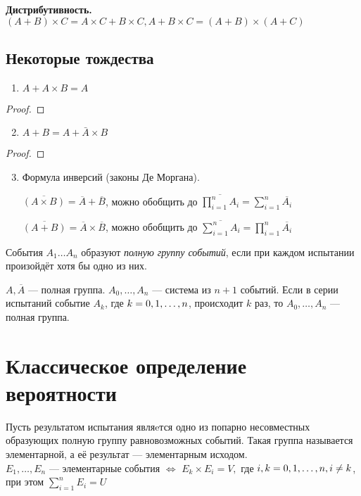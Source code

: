 \textbf{Дистрибутивность.} $(A + B)\times C = A\times C + B\times C,  A + B\times C = (A + B)\times (A + C)$

\subsection{Некоторые тождества}
\begin{enumerate}
	\item $A + A\times B = A$
\end{enumerate}
\begin{proof}
\end{proof}

\begin{enumerate}
	\setcounter{enumi}{1}
	\item{$A + B = A + \bar{A}\times B$}
\end{enumerate}
\begin{proof}
\end{proof}

\begin{enumerate}
	\setcounter{enumi}{2}
	\item Формула инверсий (законы Де Моргана).
	      \smallskip

	      $\overline{(A\times B)} = \overline{A} + \overline{B}$, можно обобщить до $\overline{\prod\limits_{i=1}^n A_i} = \sum\limits_{i=1}^n \overline{A_i} $

	      $\overline{(A + B)} = \overline{A}\times \overline{B}$, можно обобщить до $\overline{\sum\limits_{i=1}^n A_i} = \prod\limits_{i=1}^n \overline{A_i} $
\end{enumerate}
События $A_1 \dots A_n$ образуют \textit{полную группу событий}, если при каждом испытании произойдёт хотя бы одно из них.
\smallskip

\example $A, \overline{A}$ --- полная группа.
\example $A_0, \ldots, A_n$ --- система из $n+1$ событий. Если в серии испытаний событие $A_k$, где $k = 0,1,\dots,n$, происходит $k$ раз, то $A_0, \ldots, A_n$ --- полная группа.

\section{Классическое определение вероятности}
Пусть результатом испытания являeтся одно из попарно несовместных образующих полную группу равновозможных событий. Такая группа называется элементарной, а её результат --- элементарным исходом. \\
$E_1, \dots, E_n$ --- элементарные события $\Leftrightarrow$ $E_k\times E_i = V,$ где $i, k = 0,1,\dots,n, i \not= k$, при этом $\sum\limits_{i = 1}^n E_i = U$

